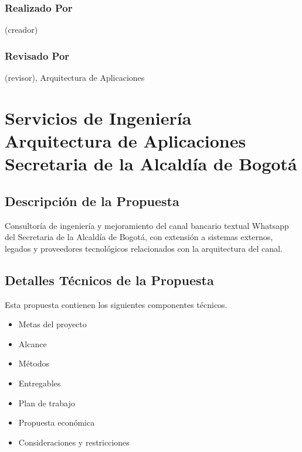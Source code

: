 \documentclass[
	a4paper, %
	12pt, %
]{include/CSSullivanBusinessReport}
\def\tightlist{}
\begin{document}
\subsubsection{Realizado Por}\label{sec:realizado-por}

(creador)

\subsubsection{Revisado Por}\label{sec:revisado-por}

(revisor), Arquitectura de Aplicaciones

\newpage

\section{Servicios de Ingeniería Arquitectura de Aplicaciones Secretaria
de la Alcaldía de
Bogotá}\label{sec:servicios-de-ingenieruxeda-arquitectura-de-aplicaciones-secretaria-de-la-alcalduxeda-de-bogotuxe1}

\subsection{Descripción de la
Propuesta}\label{sec:descripciuxf3n-de-la-propuesta}

\begin{quote}
\end{quote}

Consultoría de ingeniería y mejoramiento del canal bancario textual
Whatsapp del Secretaria de la Alcaldía de Bogotá, con extensión a
sistemas externos, legados y proveedores tecnológicos relacionados con
la arquitectura del canal.

\subsection{Detalles Técnicos de la
Propuesta}\label{sec:detalles-tuxe9cnicos-de-la-propuesta}

\begin{quote}
\end{quote}

Esta propuesta contienen los siguientes componentes técnicos.

\begin{itemize}
\tightlist
\item
  Metas del proyecto
\item
  Alcance
\item
  Métodos
\item
  Entregables
\item
  Plan de trabajo
\item
  Propuesta económica
\item
  Consideraciones y restricciones
\end{itemize}
\end{document}
